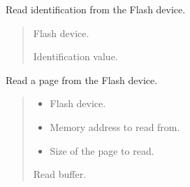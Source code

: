 \documentclass[letterpaper,10pt,english]{sphinxmanual}
\begin{document}
\begin{fulllineitems}
\begin{fulllineitems}
\label{\detokenize{cplddocs:management_flash.MngProgFlash.FlashDevice_readIdentification}}
\pysigstartsignatures
{}
\pysigstopsignatures
\sphinxAtStartPar
Read identification from the Flash device.
\begin{quote}\begin{description}
\sphinxAtStartPar
{} \textendash{} Flash device.

\sphinxAtStartPar
Identification value.

\end{description}\end{quote}

\end{fulllineitems}


\begin{fulllineitems}
\label{\detokenize{cplddocs:management_flash.MngProgFlash.FlashDevice_readPage}}
\pysigstartsignatures
{}
\pysigstopsignatures
\sphinxAtStartPar
Read a page from the Flash device.
\begin{quote}\begin{description}
\begin{itemize}
\item {} 
\sphinxAtStartPar
{} \textendash{} Flash device.

\item {} 
\sphinxAtStartPar
{} \textendash{} Memory address to read from.

\item {} 
\sphinxAtStartPar
{} \textendash{} Size of the page to read.

\end{itemize}

\sphinxAtStartPar
Read buffer.


\end{description}
\end{quote}
\end{fulllineitems}
\end{fulllineitems}
\end{document}
